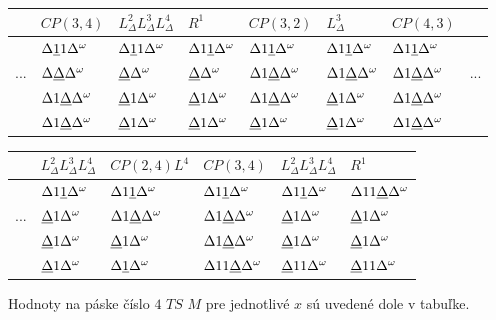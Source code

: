 \documentclass[11pt,a4paper]{article}
\newcommand{\D}{\Delta}
\newcommand{\EOT}{\Delta^\omega} %
\newcommand{\UL}[1]{\underbar{$#1$}} %
\begin{document}
\begin{center}
  \begin{tabular}{r|l|l|l|l|l|l|l}
        &\tiny{$CP(3,4)$}    & \tiny{$L^2_\D L^3_\D L^4_\D$} & \tiny{$R^1$}       & \tiny{$CP(3,2)$}    & \tiny{$L^3_\D$}     & \tiny{$CP(4,3)$}    & \\\hline
        &$\D \UL{1} 1 \EOT$  & $\D \UL{1} 1 \EOT$            & $\D 1 \UL{1} \EOT$ & $\D 1 \UL{1} \EOT$  & $\D 1 \UL{1} \EOT$  & $\D 1 \UL{1} \EOT$  & \\
    ... &$\D \UL{\D} \EOT$   & $\UL{\D} \EOT$                & $\UL{\D} \EOT$     & $\D 1 \UL{\D} \EOT$ & $\D 1 \UL{\D} \EOT$ & $\D 1 \UL{\D} \EOT$ & ... \\
        &$\D 1 \UL{\D} \EOT$ & $\UL{\D} 1 \EOT$              & $\UL{\D} 1 \EOT$   & $\D 1 \UL{\D} \EOT$ & $\UL{\D} 1 \EOT$    & $\D 1 \UL{\D} \EOT$ & \\
        &$\D 1 \UL{\D} \EOT$ & $\UL{\D} 1 \EOT$              & $\UL{\D} 1 \EOT$   & $\UL{\D} 1 \EOT$    & $\UL{\D} 1 \EOT$    & $\D 1 \UL{\D} \EOT$ & \\
  \end{tabular}
\end{center}

\begin{flushright}
  \begin{tabular}{r|l|l|l|l|l}
        & \tiny{$L^2_\D L^3_\D L^4_\D$} & \tiny{$CP(2,4)L^4$} & \tiny{$CP(3,4)$}      & \tiny{$L^2_\D L^3_\D L^4_\D$} & \tiny{$R^1$}          \\\hline
        & $\D 1 \UL{1} \EOT$            & $\D 1 \UL{1} \EOT$  & $\D 1 \UL{1} \EOT$    & $\D 1 \UL{1} \EOT$            & $\D 1 1 \UL{\D} \EOT$ \\
    ... & $\UL{\D} 1 \EOT$              & $\D 1 \UL{\D} \EOT$ & $\D 1 \UL{\D} \EOT$   & $\UL{\D} 1 \EOT$              & $\UL{\D} 1 \EOT$      \\
        & $\UL{\D} 1 \EOT$              & $\UL{\D} 1 \EOT$    & $\D 1 \UL{\D} \EOT$   & $\UL{\D} 1 \EOT$              & $\UL{\D} 1 \EOT$      \\
        & $\UL{\D} 1 \EOT$              & $\D \UL{1} \EOT$    & $\D 1 1 \UL{\D} \EOT$ & $\UL{\D} 1 1 \EOT$            & $\UL{\D} 1 1 \EOT$    \\
  \end{tabular}
\end{flushright}

Hodnoty na páske číslo $4$ $TS$ $M$ pre jednotlivé $x$ sú uvedené dole v tabuľke.
\end{document}

